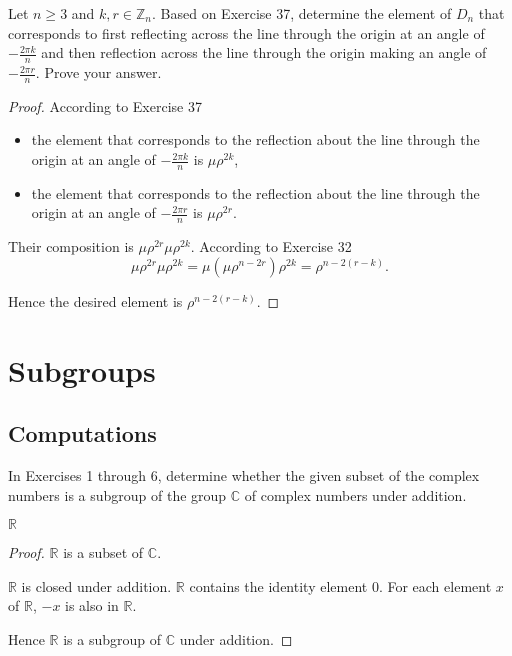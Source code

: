 \newpage
\begin{exercise}
    Let $n\geq 3$ and $k, r\in\mathbb{Z}_{n}$. Based on Exercise 37, determine the element of $D_{n}$ that corresponds to first reflecting across the line through the origin at an angle of $-\frac{2\pi k}{n}$ and then reflection across the line through the origin making an angle of $-\frac{2\pi r}{n}$. Prove your answer.
\end{exercise}

\begin{proof}
    According to Exercise 37
    \begin{itemize}
        \item the element that corresponds to the reflection about the line through the origin at an angle of $-\frac{2\pi k}{n}$ is $\mu\rho^{2k}$,
        \item the element that corresponds to the reflection about the line through the origin at an angle of $-\frac{2\pi r}{n}$ is $\mu\rho^{2r}$.
    \end{itemize}

    Their composition is $\mu\rho^{2r}\mu\rho^{2k}$. According to Exercise 32
    \[
        \mu\rho^{2r}\mu\rho^{2k} = \mu(\mu\rho^{n-2r})\rho^{2k} = \rho^{n-2(r-k)}.
    \]

    Hence the desired element is $\rho^{n-2(r-k)}$.
\end{proof}

\newpage
\section{Subgroups}

\subsection*{Computations}

In Exercises 1 through 6, determine whether the given subset of the complex numbers is a subgroup of the group $\mathbb{C}$ of complex numbers under addition.

\newpage
\begin{exercise}
    $\mathbb{R}$
\end{exercise}

\begin{proof}
    $\mathbb{R}$ is a subset of $\mathbb{C}$.

    $\mathbb{R}$ is closed under addition. $\mathbb{R}$ contains the identity element $0$. For each element $x$ of $\mathbb{R}$, $-x$ is also in $\mathbb{R}$.

    Hence $\mathbb{R}$ is a subgroup of $\mathbb{C}$ under addition.
\end{proof}

